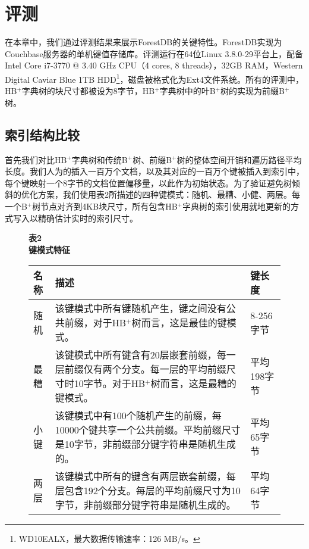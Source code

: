 \section{评测}

在本章中，我们通过评测结果来展示ForestDB的关键特性。ForestDB实现为Couchbase服务器的单机键值存储库。评测运行在64位Linux 3.8.0-29平台上，配备Intel Core i7-3770 @ 3.40 GHz CPU（4 cores, 8 threads），32GB RAM，Western Digital Caviar Blue 1TB HDD\footnote{WD10EALX，最大数据传输速率：126 MB/s。}，磁盘被格式化为Ext4文件系统。所有的评测中，HB$^+$字典树的块尺寸都被设为8字节，HB$^+$字典树中的叶B$^+$树的实现为前缀B$^+$树。

\subsection{索引结构比较}

首先我们对比HB$^+$字典树和传统B$^+$树、前缀B$^+$树的整体空间开销和遍历路径平均长度。我们人为的插入一百万个文档，以及其对应的一百万个键被插入到索引中，每个键映射一个8字节的文档位置偏移量，以此作为初始状态。为了验证避免树倾斜的优化方案，我们使用表2所描述的四种键模式：随机、最糟、小健、两层。每一个B$^+$树节点对齐到4KB块尺寸，所有包含HB$^+$字典树的索引使用就地更新的方式写入以精确估计实时的索引尺寸。

\begin{figure}[htbp]
    \centering
    {
    \bfseries
    表2 \\
    键模式特征 \\[1.5em]
    }
    \begin{tabular}{|p{2em}p{30em}p{6em}|}
    \hline
    名称 & 描述 & 键长度 \\
    \hline
    随机 & 该键模式中所有键随机产生，键之间没有公共前缀，对于HB$^+$树而言，这是最佳的键模式。 & 8-256字节 \\
    最糟 & 该键模式中所有键含有20层嵌套前缀，每一层前缀仅有两个分支。每一层的平均前缀尺寸时10字节。对于HB$^+$树而言，这是最糟的键模式。 & 平均198字节 \\
    小键 & 该键模式中有100个随机产生的前缀，每10000个键共享一个公共前缀。平均前缀尺寸是10字节，非前缀部分键字符串是随机生成的。 & 平均65字节 \\
    两层 & 该键模式中所有的键含有两层嵌套前缀，每层包含192个分支。每层的平均前缀尺寸为10字节，非前缀部分键字符串是随机生成的。 & 平均64字节 \\
    \hline
    \end{tabular}
\end{figure}

